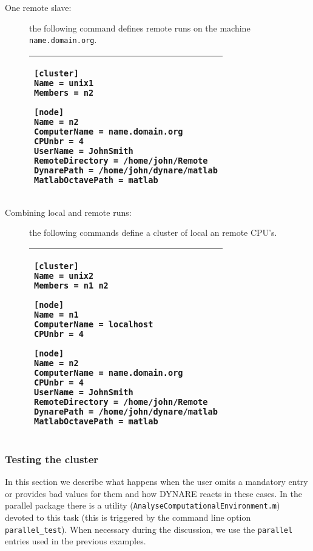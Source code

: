 \documentclass[12pt,a4paper,pdftex]{article}
\begin{document}
\begin{description}
\item[One remote slave:] the following command defines remote runs on the machine \verb"name.domain.org".\\
\singlespacing
{\footnotesize
\hspace{2cm}\begin{tabular}[b]{| p{8cm} |}
  \hline
\begin{verbatim}
[cluster]
Name = unix1
Members = n2

[node]
Name = n2
ComputerName = name.domain.org
CPUnbr = 4
UserName = JohnSmith
RemoteDirectory = /home/john/Remote
DynarePath = /home/john/dynare/matlab
MatlabOctavePath = matlab
\end{verbatim}
\\ \hline
\end{tabular}
}
\doublespacing
\item[Combining local and remote runs:] the following commands define a cluster of local an remote CPU's.
\singlespacing
{\footnotesize
\hspace{2cm}\begin{tabular}[b]{| p{8cm} |}
  \hline
\begin{verbatim}
[cluster]
Name = unix2
Members = n1 n2

[node]
Name = n1
ComputerName = localhost
CPUnbr = 4

[node]
Name = n2
ComputerName = name.domain.org
CPUnbr = 4
UserName = JohnSmith
RemoteDirectory = /home/john/Remote
DynarePath = /home/john/dynare/matlab
MatlabOctavePath = matlab
\end{verbatim}
\\ \hline
\end{tabular}
}
\doublespacing
\end{description}

\subsubsection{Testing the cluster}

In this section we describe what happens when the user omits a mandatory entry or provides bad values for them and how DYNARE reacts in these cases. In the parallel package there is a utility (\verb"AnalyseComputationalEnvironment.m") devoted to this task (this is triggered by the command line option \verb"parallel_test"). When necessary during the discussion, we use the \verb"parallel" entries used in the previous examples.
\end{document}
